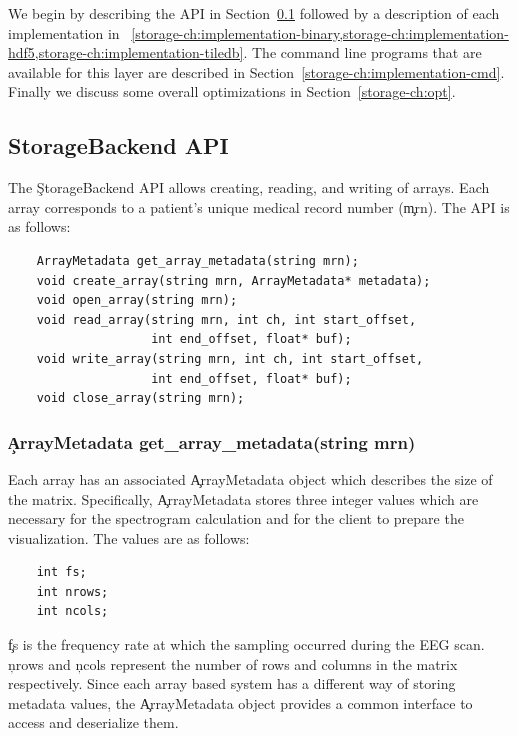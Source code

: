 We begin by describing the API in Section~\ref{storage-ch:api} followed by a
description of each implementation in
~\cref{storage-ch:implementation-binary,storage-ch:implementation-hdf5,storage-ch:implementation-tiledb}.
The command line programs that are available for this layer are described in
Section~\ref{storage-ch:implementation-cmd}. Finally we discuss some overall
optimizations in Section~\ref{storage-ch:opt}.

\subsection{StorageBackend API}\label{storage-ch:api}

The \c{StorageBackend} API allows creating, reading, and writing of arrays.
Each array corresponds to a patient's unique medical record number (\c{mrn}).
The API is as follows:

\begin{lstlisting}
    ArrayMetadata get_array_metadata(string mrn);
    void create_array(string mrn, ArrayMetadata* metadata);
    void open_array(string mrn);
    void read_array(string mrn, int ch, int start_offset,
                    int end_offset, float* buf);
    void write_array(string mrn, int ch, int start_offset,
                    int end_offset, float* buf);
    void close_array(string mrn);
\end{lstlisting}

\subsubsection{\c{ArrayMetadata get\_array\_metadata(string mrn)}}

Each array has an associated \c{ArrayMetadata} object which describes the size
of the matrix. Specifically, \c{ArrayMetadata} stores three integer values which
are necessary for the spectrogram calculation and for the client to prepare the
visualization. The values are as follows:

\begin{lstlisting}
    int fs;
    int nrows;
    int ncols;
\end{lstlisting}

\c{fs} is the frequency rate at which the sampling occurred during the EEG
scan. \c{nrows} and \c{ncols} represent the number of rows and columns in the
matrix respectively. Since each array based system has a different way of
storing metadata values, the \c{ArrayMetadata} object provides a common
interface to access and deserialize them.

